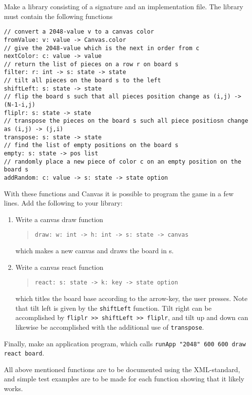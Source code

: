 Make a library consisting of a signature and an implementation file. The library must contain the following functions
\begin{lstlisting}
// convert a 2048-value v to a canvas color
fromValue: v: value -> Canvas.color
// give the 2048-value which is the next in order from c
nextColor: c: value -> value
// return the list of pieces on a row r on board s
filter: r: int -> s: state -> state
// tilt all pieces on the board s to the left
shiftLeft: s: state -> state
// flip the board s such that all pieces position change as (i,j) -> (N-1-i,j)
fliplr: s: state -> state
// transpose the pieces on the board s such all piece positiosn change as (i,j) -> (j,i)
transpose: s: state -> state
// find the list of empty positions on the board s
empty: s: state -> pos list
// randomly place a new piece of color c on an empty position on the board s
addRandom: c: value -> s: state -> state option
\end{lstlisting}
With these functions and Canvas it is possible to program the game in a few lines. Add the following to your library:
\begin{enumerate}
\item Write a canvas draw function
  \begin{quote}
    \lstinline{draw: w: int -> h: int -> s: state -> canvas}
  \end{quote}
  which makes a new canvas and draws the board in s.
\item Write a canvas react function
  \begin{quote}
    \lstinline{react: s: state -> k: key -> state option}
  \end{quote}
  which titles the board base according to the arrow-key, the user presses. Note that tilt left is given by the \lstinline{shiftLeft} function. Tilt right can be accomplished by \lstinline{fliplr >> shiftLeft >> fliplr}, and tilt up and down can likewise be accomplished with the additional use of \lstinline{transpose}.
\end{enumerate}
Finally, make an application program, which calls \lstinline{runApp "2048" 600 600 draw react board}.

All above mentioned functions are to be documented using the XML-standard, and simple test examples are to be made for each function showing that it likely works.
